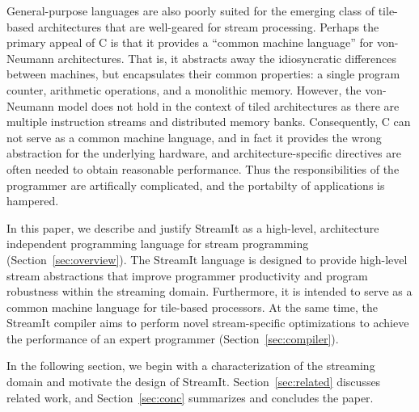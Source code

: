 General-purpose  languages are  also  poorly suited  for the  emerging
class of  tile-based architectures \cite{smartmemories,rawshort,trips}
that are  well-geared  for stream processing.   Perhaps the
primary appeal of C is  that it provides a ``common machine language''
for  von-Neumann  architectures.   That  is,  it  abstracts  away  the
idiosyncratic  differences between  machines,  but encapsulates  their
common  properties: a single  program counter,  arithmetic operations,
and a monolithic memory.  However, the von-Neumann model does not hold
in  the   context  of  tiled  architectures  as   there  are  multiple
instruction streams and distributed  memory banks. Consequently, C can
not serve  as a common machine  language, and in fact  it provides the
wrong    abstraction     for    the    underlying     hardware,    and
architecture-specific directives are often needed to obtain reasonable
performance.   Thus   the  responsibilities  of   the  programmer  are
artifically  complicated,   and  the  portabilty   of  applications  is
hampered.

In  this paper,  we describe  and  justify StreamIt  as a  high-level,
architecture independent  programming language for  stream programming
(Section~\ref{sec:overview}).  The  StreamIt  language is  designed  to
provide  high-level   stream  abstractions  that   improve  programmer
productivity   and    program   robustness   within    the   streaming
domain.  Furthermore, it  is intended  to  serve as  a common  machine
language for  tile-based processors.  At  the same time,  the StreamIt
compiler  aims  to  perform  novel  stream-specific  optimizations  to
achieve     the     performance     of    an     expert     programmer
(Section~\ref{sec:compiler}). 

In  the following  section, we  begin with  a characterization  of the
streaming   domain  and   motivate   the  design   of  StreamIt.    
Section~\ref{sec:related} discusses related
work, and Section~\ref{sec:conc} summarizes and concludes the paper.
